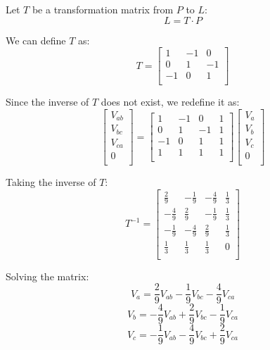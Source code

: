 Let \( T \) be a transformation matrix from \( P \) to \( L \):
\[
    L = T \cdot P
\]

We can define \( T \) as:
\[
    T = \begin{bmatrix}
        1  & -1 & 0  \\
        0  & 1  & -1 \\
        -1 & 0  & 1  \\
    \end{bmatrix}
\]

Since the inverse of \( T \) does not exist, we redefine it as:
\[
    \begin{bmatrix}
        V_{ab} \\
        V_{bc} \\
        V_{ca} \\
        0      \\
    \end{bmatrix} = \begin{bmatrix}
        1  & -1 & 0  & 1 \\
        0  & 1  & -1 & 1 \\
        -1 & 0  & 1  & 1 \\
        1  & 1  & 1  & 1 \\
    \end{bmatrix} \begin{bmatrix}
        V_a \\
        V_b \\
        V_c \\
        0   \\
    \end{bmatrix}
\]

Taking the inverse of \( T \):
\[
    T^{-1} = \begin{bmatrix}
        \frac{2}{9}  & -\frac{1}{9} & -\frac{4}{9} & \frac{1}{3} \\
        -\frac{4}{9} & \frac{2}{9}  & -\frac{1}{9} & \frac{1}{3} \\
        -\frac{1}{9} & -\frac{4}{9} & \frac{2}{9}  & \frac{1}{3} \\
        \frac{1}{3}  & \frac{1}{3}  & \frac{1}{3}  & 0           \\
    \end{bmatrix}
\]

Solving the matrix:
\[
    V_a = \frac{2}{9}V_{ab} - \frac{1}{9}V_{bc} - \frac{4}{9}V_{ca}
\]
\[
    V_b = -\frac{4}{9}V_{ab} + \frac{2}{9}V_{bc} - \frac{1}{9}V_{ca}
\]
\[
    V_c = -\frac{1}{9}V_{ab} - \frac{4}{9}V_{bc} + \frac{2}{9}V_{ca}
\]

